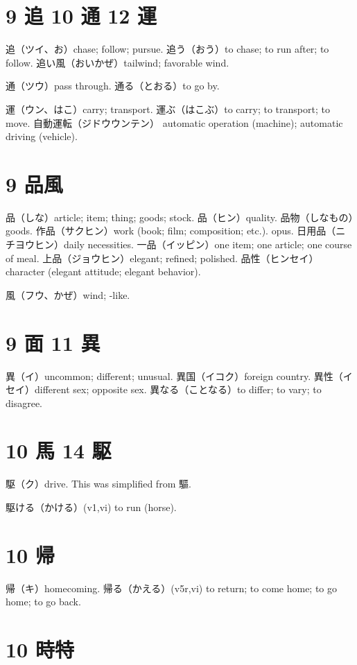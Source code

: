 \section{9 追 10 通 12 運}

追（ツイ、お）chase; follow; pursue.
追う（おう）to chase; to run after; to follow.
追い風（おいかぜ）tailwind; favorable wind.

通（ツウ）pass through.
通る（とおる）to go by.

運（ウン、はこ）carry; transport.
運ぶ（はこぶ）to carry; to transport; to move.
自動運転（ジドウウンテン）
automatic operation (machine); automatic driving (vehicle).

\section{9 品風}

品（しな）article; item; thing; goods; stock.
品（ヒン）quality.
品物（しなもの）goods.
作品（サクヒン）work (book; film; composition; etc.). opus.
日用品（ニチヨウヒン）daily necessities.
一品（イッピン）one item; one article; one course of meal.
上品（ジョウヒン）elegant; refined; polished.
品性（ヒンセイ）character (elegant attitude; elegant behavior).

風（フウ、かぜ）wind; -like.

\section{9 面 11 異}

異（イ）uncommon; different; unusual.
異国（イコク）foreign country.
異性（イセイ）different sex; opposite sex.
異なる（ことなる）to differ; to vary; to disagree.

\section{10 馬 14 駆}

駆（ク）drive.
This was simplified from 驅.

駆ける（かける）(v1,vi) to run (horse).

\section{10 帰}

帰（キ）homecoming.
帰る（かえる）(v5r,vi)
to return; to come home; to go home; to go back.

\section{10 時特}

